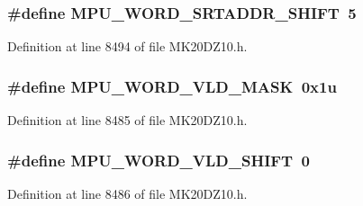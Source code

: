 \subsubsection[{\texorpdfstring{M\+P\+U\+\_\+\+W\+O\+R\+D\+\_\+\+S\+R\+T\+A\+D\+D\+R\+\_\+\+S\+H\+I\+FT}{MPU_WORD_SRTADDR_SHIFT}}]{\setlength{\rightskip}{0pt plus 5cm}\#define M\+P\+U\+\_\+\+W\+O\+R\+D\+\_\+\+S\+R\+T\+A\+D\+D\+R\+\_\+\+S\+H\+I\+FT~5}\hypertarget{group___m_p_u___register___masks_ga2a0a92430b9fff9f248ae1ffbe086513}{}\label{group___m_p_u___register___masks_ga2a0a92430b9fff9f248ae1ffbe086513}


Definition at line 8494 of file M\+K20\+D\+Z10.\+h.

\subsubsection[{\texorpdfstring{M\+P\+U\+\_\+\+W\+O\+R\+D\+\_\+\+V\+L\+D\+\_\+\+M\+A\+SK}{MPU_WORD_VLD_MASK}}]{\setlength{\rightskip}{0pt plus 5cm}\#define M\+P\+U\+\_\+\+W\+O\+R\+D\+\_\+\+V\+L\+D\+\_\+\+M\+A\+SK~0x1u}\hypertarget{group___m_p_u___register___masks_ga44e24e528550aa8ae4520965651fc1d9}{}\label{group___m_p_u___register___masks_ga44e24e528550aa8ae4520965651fc1d9}


Definition at line 8485 of file M\+K20\+D\+Z10.\+h.

\subsubsection[{\texorpdfstring{M\+P\+U\+\_\+\+W\+O\+R\+D\+\_\+\+V\+L\+D\+\_\+\+S\+H\+I\+FT}{MPU_WORD_VLD_SHIFT}}]{\setlength{\rightskip}{0pt plus 5cm}\#define M\+P\+U\+\_\+\+W\+O\+R\+D\+\_\+\+V\+L\+D\+\_\+\+S\+H\+I\+FT~0}\hypertarget{group___m_p_u___register___masks_ga9b01ac6c738050f879b0d513ac37afbd}{}\label{group___m_p_u___register___masks_ga9b01ac6c738050f879b0d513ac37afbd}


Definition at line 8486 of file M\+K20\+D\+Z10.\+h.

